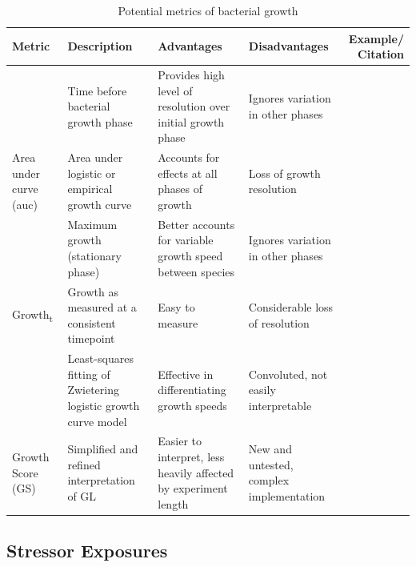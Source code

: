 \documentclass[final,1p,times]{elsarticle}
\begin{document}
\begin{table}[ht]
\centering
\scriptsize
\begin{tabular}{L M L L N}
\toprule 
\textbf{Metric} & \textbf{Description} & \textbf{Advantages} & \textbf{Disadvantages} & \textbf{Example/ Citation} \\
\midrule
{} & Time before bacterial growth phase & Provides high level of resolution over initial growth phase & Ignores variation in other phases & \cite{Monod1949} \\
{Area under curve (auc)} & Area under logistic or empirical growth curve & Accounts for effects at all phases of growth & Loss of growth resolution & \cite{Firsov2001} \\
 & Maximum growth (stationary phase) & Better accounts for variable growth speed between species & Ignores variation in other phases & \cite{Chapman2018} \\
{Growth\textsubscript{t}} & Growth as measured at a consistent timepoint & Easy to measure & Considerable loss of resolution & \cite{Hall2014} \\
 & Least-squares fitting of Zwietering logistic growth curve model & Effective in differentiating growth speeds &  Convoluted, not easily interpretable & \cite{Cuevas2017,Cuevas2018}\\
{Growth Score (GS)} & Simplified and refined interpretation of GL & Easier to interpret, less heavily affected by experiment length & New and untested, complex implementation & \cite{Cuevas2018}\\
\bottomrule
\end{tabular}
\caption{Potential metrics of bacterial growth}
\label{tab:metrics}
\end{table}

\subsection{Stressor Exposures}
\label{S:2:5}
\end{document}
